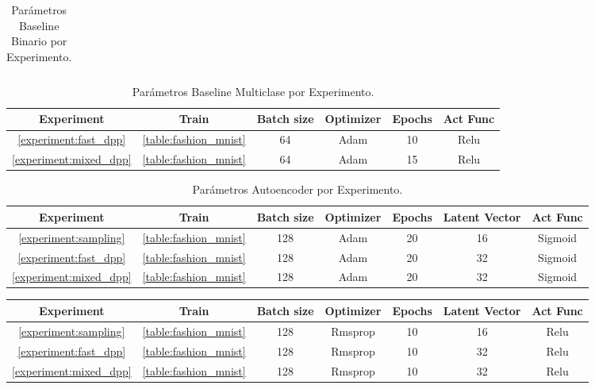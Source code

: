 \begin{appendixs}
\begin{table}[ht]
\begin{tabular}{|c|c|c|c|c|c|}
    \end{tabular}
    \caption{Parámetros Baseline Binario por Experimento.}
    \label{table:baseline2d_parameters}
    \end{table}
    
   \begin{table}[ht]
    \begin{tabular}{|c|c|c|c|c|c|}
    \hline
    Experiment & Train & Batch size & Optimizer & Epochs &  Act Func \\ \hline

    \ref{experiment:fast_dpp}      & \ref{table:fashion_mnist}    & 64        & Adam      & 10                & Relu         \\ \hline
    \ref{experiment:mixed_dpp}      & \ref{table:fashion_mnist}    & 64        & Adam      & 15                 & Relu         \\ \hline

    \end{tabular}
    \caption{Parámetros Baseline Multiclase por Experimento.}
    \label{table:conv_parameters}
    \end{table}
  
  \begin{table}[ht]
    \begin{tabular}{|c|c|c|c|c|c|c|}
    \hline
    Experiment & Train & Batch size & Optimizer & Epochs & Latent Vector & Act Func \\ \hline
    \ref{experiment:sampling}      & \ref{table:fashion_mnist}   & 128        & Adam      & 20     & 16                & Sigmoid         \\ \hline
    \ref{experiment:fast_dpp}      & \ref{table:fashion_mnist}    & 128        & Adam      & 20     & 32                & Sigmoid         \\ \hline
    \ref{experiment:mixed_dpp}      & \ref{table:fashion_mnist}    & 128        & Adam      & 20     & 32                & Sigmoid         \\ \hline
    \end{tabular}
    \caption{Parámetros Autoencoder por Experimento.}
    \label{table:autoencoder_parameters}
    \end{table}
  
  
  \begin{table}[ht]
    \begin{tabular}{|c|c|c|c|c|c|c|}
    \hline
    Experiment & Train & Batch size & Optimizer & Epochs & Latent Vector & Act Func \\ \hline
    \ref{experiment:sampling}      & \ref{table:fashion_mnist}    & 128        & Rmsprop      & 10     & 16                & Relu         \\ \hline
    \ref{experiment:fast_dpp}      & \ref{table:fashion_mnist}    & 128        & Rmsprop      & 10     & 32                & Relu         \\ \hline
    \ref{experiment:mixed_dpp}      & \ref{table:fashion_mnist}    & 128        & Rmsprop      & 10     & 32                & Relu         \\ \hline
    

\end{tabular}
\end{table}
\end{appendixs}
